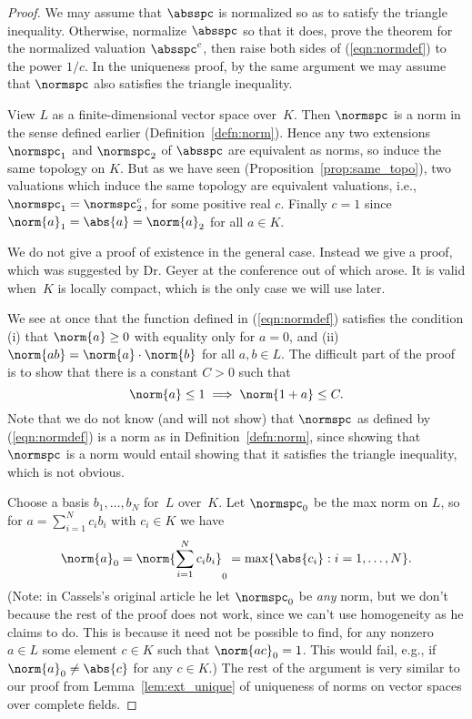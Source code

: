 \begin{proof}
We may assume that $\absspc$ is normalized so as
to satisfy the triangle inequality.  Otherwise, normalize
$\absspc$ so that it does, prove the theorem for the normalized 
valuation $\absspc^c$, then raise both sides of (\ref{eqn:normdef})
to the power $1/c$.  In the uniqueness proof, by the same
argument we may assume that $\normspc$ also satisfies the triangle
inequality.

\vspace{1ex}  View $L$ as a
finite-dimensional vector space over~$K$. Then $\normspc$ is a norm in
the sense defined earlier (Definition~\ref{defn:norm}).  Hence any two
extensions $\normspc_1$ and $\normspc_2$ of $\absspc$ are equivalent
as norms, so induce the same topology on $K$.  But as we have
seen (Proposition~\ref{prop:same_topo}), two valuations which induce the same topology are
equivalent valuations, i.e., $\normspc_1 = \normspc_2^c$, for some
positive real $c$.  Finally $c=1$ since $\norm{a}_1 = \abs{a} =
\norm{a}_2$ for all $a\in K$.

\vspace{1ex}  We do not give a proof of
existence in the general case.  Instead we give a proof, which was
suggested by Dr. Geyer at the conference out of which
\cite{cassels:global} arose. It is valid when~$K$ is locally
compact, which is the only case we will use later.

We see at once that the function defined in (\ref{eqn:normdef})
satisfies the condition (i) that $\norm{a}\geq 0$ with equality only
for $a=0$, and (ii) $\norm{ab}=\norm{a}\cdot \norm{b}$ for all $a,b\in
L$.  The difficult part of the proof is to show that there is a
constant $C>0$ such that $$\norm{a}\leq 1 \implies \norm{1+a}\leq C.$$
Note that we do not know (and will not show) that $\normspc$ as
defined by (\ref{eqn:normdef}) is a norm as in
Definition~\ref{defn:norm}, since showing that $\normspc$ is a norm
would entail showing that it satisfies the triangle inequality, which
is not obvious.

Choose a basis $b_1,\ldots, b_N$ for~$L$ over~$K$.  Let $\normspc_0$
be the max norm on $L$, so for $a=\sum_{i=1}^N c_i b_i$ with $c_i\in K$ we have
$$
\norm{a}_0 = \norm{\sum_{i=1}^N c_i b_i}_0 = \max \{\abs{c_i} : i=1,\ldots, N\}.
$$
(Note: in Cassels's original article he let $\normspc_0$ be {\em
  any} norm, but we don't because the rest of the proof does not work,
since we can't use homogeneity as he claims to do.  This is because it need not
be possible to find, for any nonzero $a\in L$ some element $c\in K$ such that
$\norm{ac}_0=1$.  This would fail, e.g., if $\norm{a}_0\neq \abs{c}$
for any $c\in K$.)
The rest of the argument is very similar to our proof from
Lemma~\ref{lem:ext_unique} of uniqueness of norms on vector spaces
over complete fields.


\end{proof}
